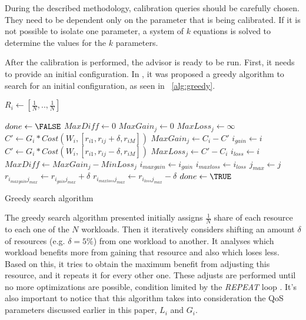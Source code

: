 During the described methodology, calibration queries should be carefully chosen. They need to be dependent only on the parameter that is being calibrated. If it is not possible to isolate one parameter, a system of $k$ equations is solved to determine the values for the $k$ parameters.

After the calibration is performed, the advisor is ready to be run. First, it needs to provide an initial configuration. In \cite{Soror:2008:AVM:1376616.1376711}, it was proposed a greedy algorithm to search for an initial configuration, as seen in ~\ref{alg:greedy}.

\begin{algorithm}[H]
 \begin{algorithmic}
	\STATE $R_{i} \gets [\frac{1}{N},..,\frac{1}{N}]$
    \ENDFOR

   \STATE $done \gets \FALSE$
   \REPEAT
	\STATE $MaxDiff \gets 0$
	    \STATE $MaxGain_{j} \gets 0$
	    \STATE $MaxLoss_{j} \gets \infty$
		 \STATE $C' \gets G_{i} * Cost(W_{i},[r_{i1},  r_{ij} + \delta, r_{iM}])$ 
		     \STATE $MaxGain_{j} \gets C_{i} - C'$
		     \STATE $i_{gain} \gets i$
		 \ENDIF
		 \STATE $C' \gets G_{i} * Cost(W_{i},[r_{i1},  r_{ij} - \delta, r_{iM}])$ 
		     \STATE $MaxLoss_{j} \gets C' - C_{i}$
		     \STATE $i_{loss} \gets i$
		 \ENDIF
	    \ENDFOR
	    \STATE {}
		\STATE $MaxDiff \gets MaxGain_{j} - MinLoss_{j}$
		\STATE $i_{maxgain} \gets i_{gain}$
		\STATE $i_{maxloss} \gets i_{loss}$
		\STATE $j_{max} \gets j$
	    \ENDIF
	\ENDFOR
	    \STATE $r_{i_{maxgain}j_{max}} \gets r_{i_{gain}j_{max}} + \delta $
	    \STATE $r_{i_{maxloss}j_{max}} \gets r_{i_{loss}j_{max}} - \delta $
	\ELSE
	    \STATE $done \gets \TRUE$
	\ENDIF

 \end{algorithmic}
  \caption{Greedy search algorithm}
  \label{alg:greedy}
\end{algorithm}
The greedy search algorithm presented initially assigns $\frac{1}{N}$ share of each resource to each one of the $N$ workloads. Then it iteratively considers shifting an amount $\delta$ of resources (e.g. $\delta = 5\%$) from one workload to another. It analyses which workload benefits more from gaining that resource and also which loses less. Based on this, it tries to obtain the maximum benefit from adjusting this resource, and it repeats it for every other one. These adjusts are performed until no more optimizations are possible, condition limited by the \textit{REPEAT} loop . It's also important to notice that this algorithm takes into consideration the QoS parameters discussed earlier in this paper, $L_{i}$ and $G_{i}$.

